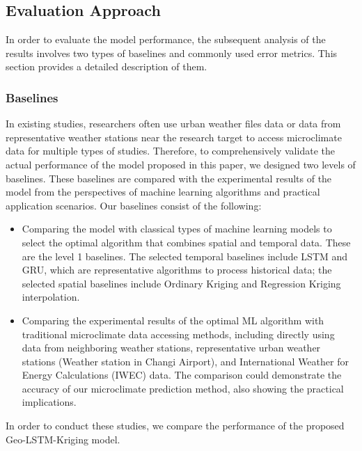 \documentclass[a4paper,fleqn]{cas-sc}
\begin{document}
\subsection{Evaluation Approach}\label{evaluation method}

In order to evaluate the model performance, the subsequent analysis of the results involves two types of baselines and commonly used error metrics. This section provides a detailed description of them.

\subsubsection{Baselines}\label{baselines}

In existing studies, researchers often use urban weather files data or data from representative weather stations near the research target to access microclimate data for multiple types of studies. Therefore, to comprehensively validate the actual performance of the model proposed in this paper, we designed two levels of baselines. These baselines are compared with the experimental results of the model from the perspectives of machine learning algorithms and practical application scenarios. Our baselines consist of the following: 
\begin{itemize}
\item Comparing the model with classical types of machine learning models to select the optimal algorithm that combines spatial and temporal data. These are the level 1 baselines. The selected temporal baselines include LSTM and GRU, which are representative algorithms to process historical data; the selected spatial baselines include Ordinary Kriging and Regression Kriging interpolation.
\item Comparing the experimental results of the optimal ML algorithm with traditional microclimate data accessing methods, including directly using data from neighboring weather stations, representative urban weather stations (Weather station in Changi Airport), and International Weather for Energy Calculations (IWEC) data. The comparison could demonstrate the accuracy of our microclimate prediction method, also showing the practical implications.

\end{itemize}

In order to conduct these studies, we compare the performance of the proposed Geo-LSTM-Kriging model.
\end{document}
